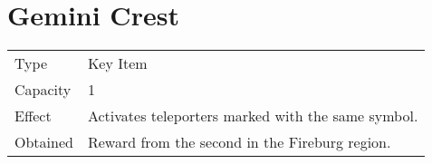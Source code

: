 \section{Gemini Crest}
\label{item:gemini_crest}


\noindent\begin{tabularx}{\textwidth}[l]{lX}
	Type
	& Key Item
\\
	Capacity
	& 1
\\
	Effect
	& Activates teleporters marked with the same symbol.
\\
	Obtained
	& Reward from the second \nameref{map:battlefield_13} in the Fireburg region.
\end{tabularx}

